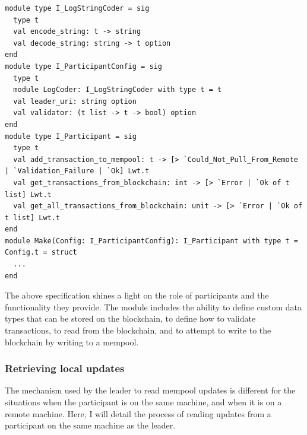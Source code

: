 \documentclass[12pt,a4paper,twoside,openright]{report}
\begin{document}
			\begin{lstlisting}
module type I_LogStringCoder = sig
  type t
  val encode_string: t -> string
  val decode_string: string -> t option
end
module type I_ParticipantConfig = sig
  type t
  module LogCoder: I_LogStringCoder with type t = t
  val leader_uri: string option
  val validator: (t list -> t -> bool) option
end
module type I_Participant = sig
  type t
  val add_transaction_to_mempool: t -> [> `Could_Not_Pull_From_Remote | `Validation_Failure | `Ok] Lwt.t
  val get_transactions_from_blockchain: int -> [> `Error | `Ok of t list] Lwt.t
  val get_all_transactions_from_blockchain: unit -> [> `Error | `Ok of t list] Lwt.t
end
module Make(Config: I_ParticipantConfig): I_Participant with type t = Config.t = struct
  ...
end
			\end{lstlisting}

			The above specification shines a light on the role of participants and the functionality they provide.
			The module includes the ability to define custom data types that can be stored on the blockchain, to define how to validate transactions, to read from the blockchain, and to attempt to write to the blockchain by writing to a mempool.

			\subsubsection*{Retrieving local updates}
			The mechanism used by the leader to read mempool updates is different for the situations when the participant is on the same machine, and when it is on a remote machine. 
			Here, I will detail the process of reading updates from a participant on the same machine as the leader.\\
\end{document}
